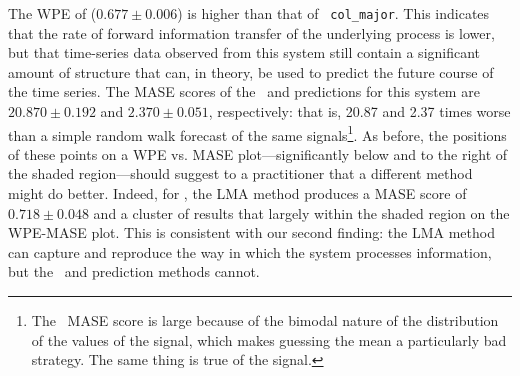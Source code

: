 The WPE of \svdfive ($0.677 \pm 0.006$) is higher than that of {\tt
  col\_major}.  This indicates that the rate of forward information
transfer of the underlying process is lower, but that time-series data
observed from this system still contain a significant amount of
structure that can, in theory, be used to predict the future course of
the time series.
The MASE scores of the \naive ~and \arima predictions for this system
are $20.870 \pm 0.192$ and $2.370 \pm 0.051$, respectively: that is,
20.87 and 2.37 times worse than a simple random walk forecast of the
same signals\footnote{The \naive ~MASE score is large because of the
  bimodal nature of the distribution of the values of the signal,
  which makes guessing the mean a particularly bad strategy.  The same
  thing is true of the \svdthree signal.}.  As before, the positions
of these points on a WPE vs. MASE plot---significantly below and to
the right of the shaded region---should suggest to a practitioner that
a different method might do better.  Indeed, for \svdfive, the LMA
method produces a MASE score of $ 0.718\pm 0.048 $ and a cluster of
results that largely within the shaded region on the WPE-MASE plot.
This is consistent with our second finding: the LMA method can capture
and reproduce the way in which the \svdfive system processes
information, but the \naive ~and \arima prediction methods cannot.

